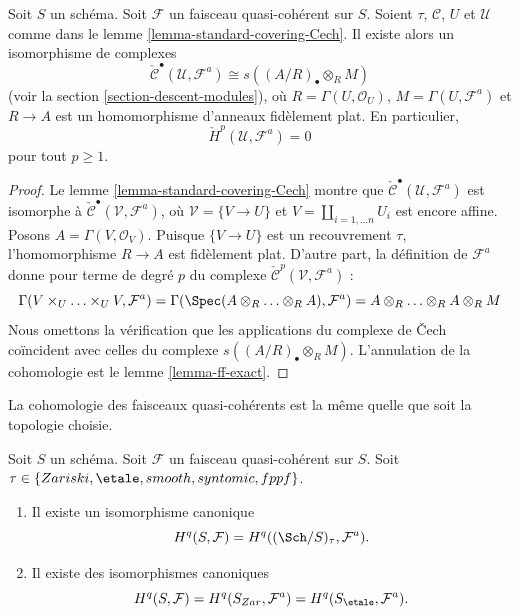 \begin{lemma}
\label{lemma-standard-covering-Cech-quasi-coherent}
Soit $S$ un schéma. Soit $\mathcal{F}$ un faisceau quasi-cohérent sur
$S$. Soient $\tau$, $\mathcal{C}$, $U$ et $\mathcal{U}$ comme dans le
lemme \ref{lemma-standard-covering-Cech}. Il existe alors un isomorphisme
de complexes
$$
\check{\mathcal{C}}^\bullet(\mathcal{U}, \mathcal{F}^a)
\cong
s((A/R)_\bullet \otimes_R M)
$$
(voir la section \ref{section-descent-modules}), où
$R = \Gamma(U, \mathcal{O}_U)$, $M = \Gamma(U, \mathcal{F}^a)$ et
$R \to A$ est un homomorphisme d'anneaux fidèlement plat. En particulier,
$$
\check{H}^p(\mathcal{U}, \mathcal{F}^a) = 0
$$
pour tout $p \geq 1$.
\end{lemma}

\begin{proof}
Le lemme \ref{lemma-standard-covering-Cech} montre que
$\check{\mathcal{C}}^\bullet(\mathcal{U}, \mathcal{F}^a)$ est isomorphe
à $\check{\mathcal{C}}^\bullet(\mathcal{V}, \mathcal{F}^a)$, où
$\mathcal{V} = \{V \to U\}$ et
$V = \coprod_{i = 1, \ldots n} U_i$ est encore affine. Posons
$A = \Gamma(V, \mathcal{O}_V)$. Puisque $\{V \to U\}$ est un
recouvrement $\tau$, l'homomorphisme $R \to A$ est fidèlement plat.
D'autre part, la définition de $\mathcal{F}^a$ donne pour terme de degré
$p$ du complexe $\check{\mathcal{C}}^p(\mathcal{V}, \mathcal{F}^a)$ :
$$
\Gamma(V \times_U \ldots \times_U V, \mathcal{F}^a)
=
\Gamma(\Spec(A \otimes_R \ldots \otimes_R A), \mathcal{F}^a)
=
A \otimes_R \ldots \otimes_R A \otimes_R M
$$
Nous omettons la vérification que les applications du complexe de
{\v C}ech coïncident avec celles du complexe
$s((A/R)_\bullet \otimes_R M)$. L'annulation de la cohomologie est le
lemme \ref{lemma-ff-exact}.
\end{proof}

\begin{proposition}
\label{proposition-same-cohomology-quasi-coherent}
\begin{slogan}
La cohomologie des faisceaux quasi-cohérents est la même quelle que soit
la topologie choisie.
\end{slogan}
Soit $S$ un schéma. Soit $\mathcal{F}$ un faisceau quasi-cohérent sur
$S$. Soit $\tau \in \{Zariski, \linebreak[0] \etale, \linebreak[0]
smooth, \linebreak[0] syntomic, \linebreak[0] fppf\}$.
\begin{enumerate}
\item Il existe un isomorphisme canonique
$$
H^q(S, \mathcal{F}) = H^q((\Sch/S)_\tau, \mathcal{F}^a).
$$
\item Il existe des isomorphismes canoniques
$$
H^q(S, \mathcal{F}) =
H^q(S_{Zar}, \mathcal{F}^a) =
H^q(S_\etale, \mathcal{F}^a).
$$
\end{enumerate}
\end{proposition}

